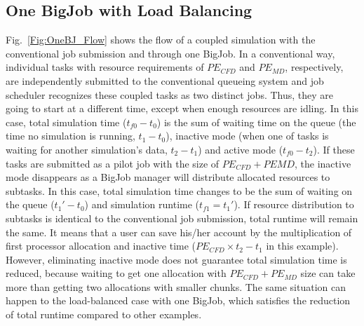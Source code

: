 \documentclass[conference,final]{IEEEtran}
\begin{document}
\subsection{One BigJob with Load Balancing}
Fig.~\ref{Fig:OneBJ_Flow} shows the flow of a coupled simulation with the conventional job submission and through one BigJob. In a conventional way, individual tasks with resource requirements of $PE_{CFD}$ and $PE_{MD}$, respectively, are independently submitted to the conventional queueing system and job scheduler recognizes these coupled tasks as two distinct jobs. Thus, they are going to start at a different time, except when enough resources are idling. In this case, total simulation time ($t_{f0}-t_{0}$) is the sum of waiting time on the queue (the time no simulation is running, $t_1-t_0$), inactive mode (when one of tasks is waiting for another simulation's data, $t_2-t_1$) and active mode ($t_{f0}-t_2$).
If these tasks are submitted as a pilot job with the size of $PE_{CFD}+PE{MD}$, the inactive mode disappears as a BigJob manager will distribute allocated resources to subtasks. In this case, total simulation time changes to be the sum of waiting on the queue ($t_{1}'-t_{0}$) and simulation runtime ($t_{f1}=t_{1}'$). If resource distribution to subtasks is identical to the conventional job submission, total runtime will remain the same. It means that a user can save his/her account by the multiplication of first processor allocation and inactive time ($PE_{CFD} \times t_2-t_1$ in this example). However, eliminating inactive mode does not guarantee total simulation time is reduced, because waiting to get one allocation with $PE_{CFD}+PE_{MD}$ size can take more than getting two allocations with smaller chunks. The same situation can happen to the load-balanced case with one BigJob, which satisfies the reduction of total runtime compared to other examples.
\end{document}
